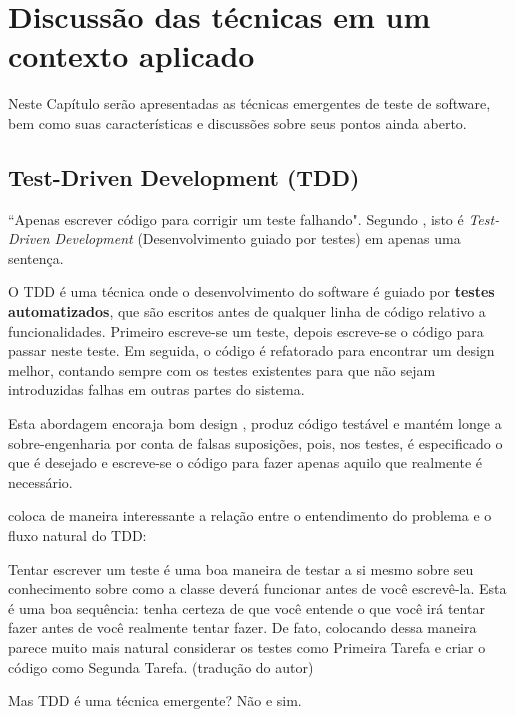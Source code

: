 \chapter{Discussão das técnicas em um contexto aplicado}

Neste Capítulo serão apresentadas as técnicas emergentes de teste de software, bem como suas características e discussões sobre seus pontos ainda aberto.

\section{Test-Driven Development (TDD)}
\label{sec:tdd}
``Apenas escrever código para corrigir um teste falhando". Segundo , isto é \textit{Test-Driven Development} (Desenvolvimento guiado por testes) \cite{TDDbyExample} em apenas uma sentença.

O TDD é uma técnica onde o desenvolvimento do software é guiado por \textbf{testes automatizados}, que são escritos antes de qualquer linha de código relativo a funcionalidades. Primeiro escreve-se um teste, depois escreve-se o código para passar neste teste. Em seguida, o código é refatorado para encontrar um design melhor, contando sempre com os testes existentes para que não sejam introduzidas falhas em outras partes do sistema.

Esta abordagem encoraja bom design \cite{GrowingOOByTests}, produz código testável e mantém longe a sobre-engenharia por conta de falsas suposições, pois, nos testes, é especificado o que é desejado e escreve-se o código para fazer apenas aquilo que realmente é necessário. \cite{TestDrivenKoskela, TDDbyExample, EmpiricalTDD}

 coloca de maneira interessante a relação entre o entendimento do problema e o fluxo natural do TDD:

\begin{citacao}
Tentar escrever um teste é uma boa maneira de testar a si mesmo sobre seu conhecimento sobre como a classe deverá funcionar antes de você escrevê-la. Esta é uma boa sequência: tenha certeza de que você entende o que você irá tentar fazer antes de você realmente tentar fazer. De fato, colocando dessa maneira parece muito mais natural considerar os testes como Primeira Tarefa e criar o código como Segunda Tarefa. (tradução do autor)
\end{citacao}

Mas TDD é uma técnica emergente? Não e sim.

